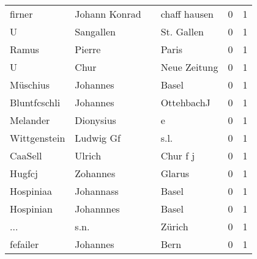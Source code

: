 \documentclass[10pt,a4paper,landscape]{article}
\begin{document}
\begin{longtable}{llllrr}
                   firner &                      Johann Konrad &             &                                chaff hausen &          0 &         1 \\
                        U &                          Sangallen &             &                                  St. Gallen &          0 &         1 \\
                    Ramus &                             Pierre &             &                                       Paris &          0 &         1 \\
                        U &                               Chur &             &                                Neue Zeitung &          0 &         1 \\
                 Müschius &                           Johannes &             &                                       Basel &          0 &         1 \\
             Bluntfcschli &                           Johannes &             &                                  OttehbachJ &          0 &         1 \\
                 Melander &                          Dionysius &             &                                           e &          0 &         1 \\
             Wittgenstein &                          Ludwig Gf &             &                                        s.l. &          0 &         1 \\
                  CaaSell &                             Ulrich &             &                                    Chur f j &          0 &         1 \\
                   Hugfcj &                           Zohannes &             &                                      Glarus &          0 &         1 \\
                Hospiniaa &                          Johannass &             &                                       Basel &          0 &         1 \\
                Hospinian &                          Johannnes &             &                                       Basel &          0 &         1 \\
                      ... &                               s.n. &             &                                      Zürich &          0 &         1 \\
                 fefailer &                           Johannes &             &                                        Bern &          0 &         1 \\

\end{longtable}
\end{document}
